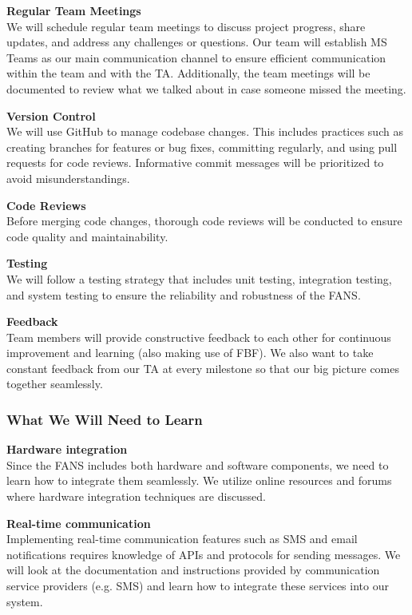 \textbf{Regular Team Meetings} \\
We will schedule regular team meetings to discuss project progress, share updates, and address any challenges or
questions. Our team will establish MS Teams as our main communication channel to ensure efficient communication within
the team and with the TA. Additionally, the team meetings will be documented to review what we talked about in case
someone missed the meeting.

\textbf{Version Control} \\
We will use GitHub to manage codebase changes. This includes practices such as creating branches for features or bug
fixes, committing regularly, and using pull requests for code reviews. Informative commit messages will be prioritized
to avoid misunderstandings.

\textbf{Code Reviews} \\
Before merging code changes, thorough code reviews will be conducted to ensure code quality and maintainability.

\textbf{Testing} \\
We will follow a testing strategy that includes unit testing, integration testing, and system testing to ensure the
reliability and robustness of the FANS.

\textbf{Feedback} \\
Team members will provide constructive feedback to each other for continuous improvement and learning (also making use
of FBF). We also want to take constant feedback from our TA at every milestone so that our big picture comes together
seamlessly.

\subsubsection{What We Will Need to Learn}

\textbf{Hardware integration} \\
Since the FANS includes both hardware and software components, we need to learn how to integrate them seamlessly. We
utilize online resources and forums where hardware integration techniques are discussed.

\textbf{Real-time communication} \\
Implementing real-time communication features such as SMS and email notifications requires
knowledge of APIs and protocols for sending messages. We will look at the documentation and instructions provided by
communication service providers (e.g. SMS) and learn how to integrate these services into our system.

